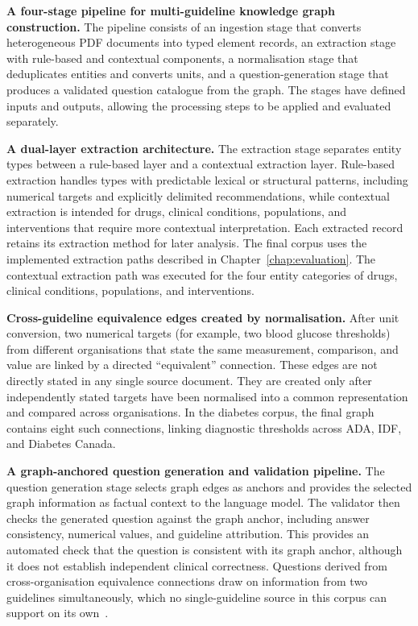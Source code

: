 \textbf{A four-stage pipeline for multi-guideline knowledge graph
construction.} The pipeline consists of an ingestion stage that converts
heterogeneous PDF documents into typed element records, an extraction stage
with rule-based and contextual components, a normalisation stage that
deduplicates entities and converts units, and a question-generation stage
that produces a validated question catalogue from the graph. The stages
have defined inputs and outputs, allowing the processing steps to be
applied and evaluated separately.

\textbf{A dual-layer extraction architecture.} The extraction stage
separates entity types between a rule-based layer and a contextual
extraction layer. Rule-based extraction handles types with predictable
lexical or structural patterns, including numerical targets and explicitly
delimited recommendations, while contextual extraction is intended for
drugs, clinical conditions, populations, and interventions that require
more contextual interpretation. Each extracted record retains its
extraction method for later analysis. The final corpus uses the implemented extraction paths described in Chapter~\ref{chap:evaluation}. The contextual extraction path was executed for the four entity categories of drugs, clinical conditions, populations, and interventions.

\textbf{Cross-guideline equivalence edges created by normalisation.} After
unit conversion, two numerical targets (for example, two blood glucose
thresholds) from different organisations that state the same measurement,
comparison, and value are linked by a directed ``equivalent'' connection.
These edges are not directly stated in any single source document. They are
created only after independently stated targets have been normalised into
a common representation and compared across organisations. In the diabetes
corpus, the final graph contains eight such connections, linking diagnostic
thresholds across ADA, IDF, and Diabetes Canada.

\textbf{A graph-anchored question generation and validation pipeline.} The
question generation stage selects graph edges as anchors and provides the
selected graph information as factual context to the language model. The
validator then checks the generated question against the graph anchor,
including answer consistency, numerical values, and guideline attribution.
This provides an automated check that the question is consistent with its
graph anchor, although it does not establish independent clinical
correctness. Questions derived from cross-organisation equivalence
connections draw on information from two guidelines simultaneously, which
no single-guideline source in this corpus can support on its
own~\cite{guo2024,bi2020}.

